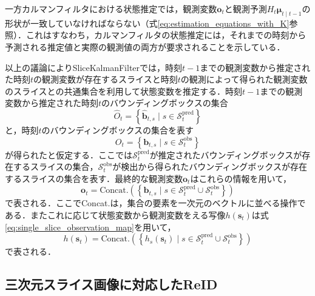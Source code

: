             一方カルマンフィルタにおける状態推定では，観測変数$\bm{o}_t$と観測予測$H_t\bm{\mu}_{t \mid t-1}$の形状が一致していなければならない（式\ref{eq:estimation_equations_with_K}参照）．これはすなわち，カルマンフィルタの状態推定には，それまでの時刻から予測される推定値と実際の観測値の両方が要求されることを示している．

            以上の議論によりSliceKalmanFilterでは，時刻$t-1$までの観測変数から推定された時刻$t$の観測変数が存在するスライスと時刻$t$の観測によって得られた観測変数のスライスとの共通集合を利用して状態変数を推定する．時刻$t-1$までの観測変数から推定された時刻$t$のバウンディングボックスの集合
            \begin{equation}
                \label{eq:sliced_bounding_boxes}
                \hat{O}_t = \left\{\hat{\bm{b}}_{t, s} \mid  s \in \mathcal{S}_t^{\text{pred}}\right\}
            \end{equation}
            と，時刻$t$のバウンディングボックスの集合を表す
            \begin{equation}
                \label{eq:observed_bounding_boxes}
                O_t = \left\{\bm{b}_{t,s} \mid s \in \mathcal{S}_t^{\text{obs}}\right\}
            \end{equation}
            が得られたと仮定する．ここでは$\mathcal{S}_t^{\text{pred}}$が推定されたバウンディングボックスが存在するスライスの集合，$\mathcal{S}_t^{\text{obs}}$が検出から得られたバウンディングボックスが存在するスライスの集合を表す．最終的な観測変数$\bm{o}_t$はこれらの情報を用いて，
            \begin{equation}
                \label{eq:skf_observation}
                \bm{o}_t = \text{Concat.}\left(\left\{\bm{b}_{t,s} \mid s \in \mathcal{S}_t^{\text{pred}} \cup \mathcal{S}_t^{\text{obs}}\right\}\right)
            \end{equation}
            で表される．ここでConcat.は，集合の要素を一次元のベクトルに並べる操作である．またこれに応じて状態変数から観測変数をえる写像$h(\bm{s}_t)$は式\ref{eq:single_slice_observation_map}を用いて，
            \begin{equation}
                \label{eq:skf_observation_map}
                h(\bm{s}_t) = \text{Concat.}\left(\left\{h_s(\bm{s}_t) \mid s \in \mathcal{S}_t^{\text{pred}} \cup \mathcal{S}_t^{\text{obs}}\right\}\right)
            \end{equation}
            で表される．

    \subsection{三次元スライス画像に対応したReID}
    \label{subsec:re-identificataion_for_slice}

